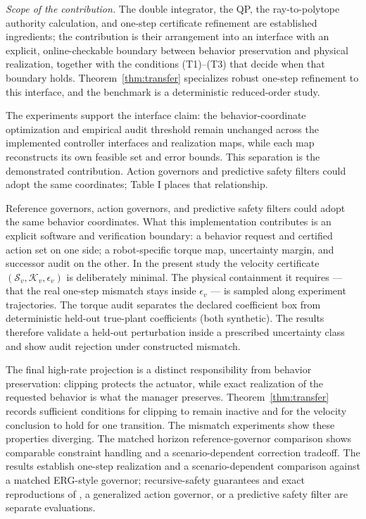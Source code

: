 \documentclass[journal]{IEEEtran}
\begin{document}
\emph{Scope of the contribution.} The double integrator, the QP, the ray-to-polytope authority calculation, and one-step certificate refinement are established ingredients; the contribution is their arrangement into an interface with an explicit, online-checkable boundary between behavior preservation and physical realization, together with the conditions (T1)--(T3) that decide when that boundary holds. Theorem~\ref{thm:transfer} specializes robust one-step refinement to this interface, and the benchmark is a deterministic reduced-order study.

The experiments support the interface claim: the behavior-coordinate optimization and empirical audit threshold remain unchanged across the implemented controller interfaces and realization maps, while each map reconstructs its own feasible set and error bounds. This separation is the demonstrated contribution. Action governors and predictive safety filters could adopt the same coordinates; Table I places that relationship.

Reference governors, action governors, and predictive safety filters could adopt the same behavior coordinates. What this implementation contributes is an explicit software and verification boundary: a behavior request and certified action set on one side; a robot-specific torque map, uncertainty margin, and successor audit on the other. In the present study the velocity certificate $(\mathcal S_v,\mathcal K_v,\epsilon_v)$ is deliberately minimal. The physical containment it requires --- that the real one-step mismatch stays inside $\epsilon_v$ --- is sampled along experiment trajectories. The torque audit separates the declared coefficient box from deterministic held-out true-plant coefficients (both synthetic). The results therefore validate a held-out perturbation inside a prescribed uncertainty class and show audit rejection under constructed mismatch.

The final high-rate projection is a distinct responsibility from behavior preservation: clipping protects the actuator, while exact realization of the requested behavior is what the manager preserves. Theorem~\ref{thm:transfer} records sufficient conditions for clipping to remain inactive and for the velocity conclusion to hold for one transition. The mismatch experiments show these properties diverging. The matched horizon reference-governor comparison shows comparable constraint handling and a scenario-dependent correction tradeoff. The results establish one-step realization and a scenario-dependent comparison against a matched ERG-style governor; recursive-safety guarantees and exact reproductions of \cite{r17}, a generalized action governor, or a predictive safety filter are separate evaluations.
\end{document}
